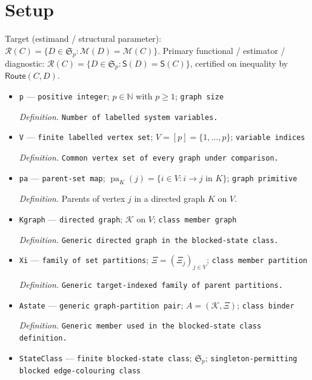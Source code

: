 \documentclass{article}
\begin{document}
\section{Setup}

Target (estimand / structural parameter): \(\mathcal R(C)=\{D\in\mathfrak S_p:\mathcal M(D)=\mathcal M(C)\}\).
Primary functional / estimator / diagnostic: \(\mathcal R(C)=\{D\in\mathfrak S_p:\mathsf S(D)=\mathsf S(C)\}\), certified on inequality by \(\mathsf{Route}(C,D)\).
\begin{itemize}
  \item \texttt{p} --- \texttt{positive integer}; \(p\in\mathbb N\) with \(p\geq 1\); \texttt{graph size}
  \par\smallskip\noindent\emph{Definition.} \texttt{Number of labelled system variables.}
  \item \texttt{V} --- \texttt{finite labelled vertex set}; \(V=[p]=\{1,\ldots,p\}\); \texttt{variable indices}
  \par\smallskip\noindent\emph{Definition.} \texttt{Common vertex set of every graph under comparison.}
  \item \texttt{pa} --- \texttt{parent-\allowbreak{}set map}; \(\operatorname{pa}_{K}(j)=\{i\in V:i\to j\text{ in }K\}\); \texttt{graph primitive}
  \par\smallskip\noindent\emph{Definition.} Parents of vertex \(j\) in a directed graph \(K\) on \(V\).
  \item \texttt{Kgraph} --- \texttt{directed graph}; \(\mathcal K\) on \(V\); \texttt{class member graph}
  \par\smallskip\noindent\emph{Definition.} \texttt{Generic directed graph in the blocked-\allowbreak{}state class.}
  \item \texttt{Xi} --- \texttt{family of set partitions}; \(\Xi=(\Xi_j)_{j\in V}\); \texttt{class member partition}
  \par\smallskip\noindent\emph{Definition.} \texttt{Generic target-\allowbreak{}indexed family of parent partitions.}
  \item \texttt{Astate} --- \texttt{generic graph-\allowbreak{}partition pair}; \(A=(\mathcal K,\Xi)\); \texttt{class binder}
  \par\smallskip\noindent\emph{Definition.} \texttt{Generic member used in the blocked-\allowbreak{}state class definition.}
  \item \texttt{StateClass} --- \texttt{finite blocked-\allowbreak{}state class}; \(\mathfrak S_p\); \texttt{singleton-\allowbreak{}permitting blocked edge-\allowbreak{}colouring class}

\end{itemize}
\end{document}
